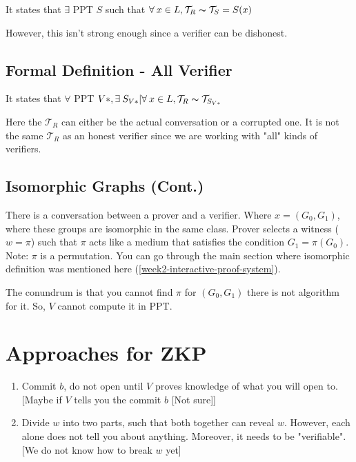 \documentclass{article}
\begin{document}
It states that $\exists$ PPT $S$ such that $\forall \: x \in L, \mathcal{T}_{R} \thicksim \mathcal{T}_{S} = S(x)$

However, this isn't strong enough since a verifier can be dishonest.

\subsection{Formal Definition - All Verifier}

It states that $\forall$ PPT $V*, \exists \: S_{V*} | \forall \: x \in L, \mathcal{T}_{R} \thicksim \mathcal{T}_{S_{V*}}$

Here the $\mathcal{T}_{R}$ can either be the actual conversation or a corrupted one. It is not the same $\mathcal{T}_{R}$ as an honest verifier since we are working with "all" kinds of verifiers.

\subsection{Isomorphic Graphs (Cont.)}

There is a conversation between a prover and a verifier. Where $x = (G_0, G_1)$, where these groups are isomorphic in the same class. Prover selects a witness ($w = \pi$) such that $\pi$ acts like a medium that satisfies the condition $G_1 = \pi(G_0)$. Note: $\pi$ is a permutation. You can go through the main section where isomorphic definition was mentioned here (\ref{week2-interactive-proof-system}).

The conundrum is that you cannot find $\pi$ for $(G_0, G_1)$ there is not algorithm for it. So, $V$ cannot compute it in PPT. 

\section{Approaches for ZKP}

\begin{enumerate}
    \item Commit $b$, do not open until $V$ proves knowledge of what you will open to. [Maybe if $V$ tells you the commit $b$ [Not sure]]
    \item Divide $w$ into two parts, such that both together can reveal $w$. However, each alone does not tell you about anything. Moreover, it needs to be "verifiable". [We do not know how to break $w$ yet]
\end{enumerate}


% 
% 
\end{document}
